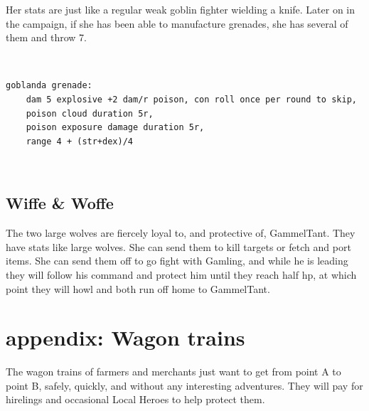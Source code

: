 Her stats are just like a regular weak goblin fighter wielding a knife. Later on in the campaign, if she has been able to manufacture grenades, she has several of them and throw 7.

\

\begin{samepage} \begin{small} \begin{verbatim}
goblanda grenade:
    dam 5 explosive +2 dam/r poison, con roll once per round to skip, 
    poison cloud duration 5r, 
    poison exposure damage duration 5r,
    range 4 + (str+dex)/4
\end{verbatim} \end{small} \end{samepage}


\

\subsection*{Wiffe \& Woffe}

The two large wolves are fiercely loyal to, and protective of, GammelTant. They have stats like large wolves. She can send them to kill targets or fetch and port items. She can send them off to go fight with Gamling, and while he is leading they will follow his command and protect him until they reach half hp, at which point they will howl and both run off home to GammelTant.



















\clearpage
\section*{appendix: Wagon trains}
\label{wagontrains}

\raggedbottom

The wagon trains of farmers and merchants just want to get from point A to point B, safely, quickly, and without any interesting adventures. They will pay for hirelings and occasional Local Heroes to help protect them. 

